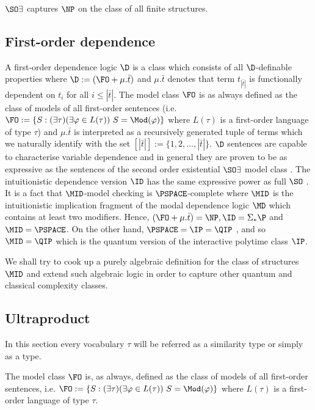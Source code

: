 \begin{thm}
 $\SO\exists$ captures $\NP$ on the class of all finite structures.
\end{thm}


\subsection{First-order dependence}

A first-order dependence logic $\D$ is a class which consists of all $\D$-definable properties where $\D := (\FO + \mu.\bar{t})$ and $\mu.\bar{t}$ denotes that term $t_{|\bar{t}|}$ is functionally dependent on $t_{i}$ for all $i\leq |\bar{t}|$. The model class $\FO$ is as always defined as the class of models of all first-order sentences (i.e. $\FO:= \{S:(\exists\tau)(\exists\varphi\in L(\tau))\ S=\Mod(\varphi)\}$ where $L(\tau)$ is a first-order language of type $\tau$) and $\mu.\bar{t}$ is interpreted as a recursively generated tuple of terms which we naturally identify with the set $[|\bar{t}|] := \{1,2,\dots,|\bar{t}|\}$. $\D$ sentences are capable to characterise variable dependence and in general they are proven to be as expressive as the sentences of the second order existential $\SO\exists$ model class \cite{dep}. The intuitionistic dependence version $\ID$ has the same expressive power as full $\SO$ \cite{dep}. It is a fact that $\MID$-model checking is $\PSPACE$-complete \cite{dep} where $\MID$ is the intuitionistic implication fragment of the modal dependence logic $\MD$ which contains at least two modifiers. Hence, $(\FO + \mu.\bar{t}) = \NP, \ID = \Sigma_{\ast}\P$ and $\MID = \PSPACE$.  On the other hand, $\PSPACE = \IP = \QIP$ \cite{qip}, and so $\MID = \QIP$ which is the quantum version of the interactive polytime class $\IP$.

We shall try to cook up a purely algebraic definition for the class of structures $\MID$ and extend such algebraic logic in order to capture other quantum and classical complexity classes. 

\subsection{Ultraproduct}

In this section every vocabulary $\tau$ will be referred as a similarity type or simply as a type.

The model class $\FO$ is, as always, defined as the class of models of all first-order sentences, i.e. $\FO:= \{S:(\exists\tau)(\exists\varphi\in L(\tau))\ S=\Mod(\varphi)\}$ where $L(\tau)$ is a first-order language of type $\tau$.

